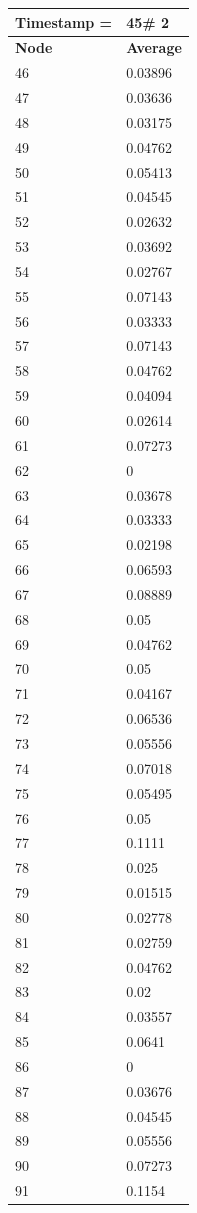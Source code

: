 \begin{tabular}{|l||l|}
\hline
\textbf{Timestamp =} & \textbf{45}\# 2\\\hline
	\textbf{Node} & \textbf{Average} \\ \hline
\hline
	46 & 0.03896 \\ \hline
	47 & 0.03636 \\ \hline
	48 & 0.03175 \\ \hline
	49 & 0.04762 \\ \hline
	50 & 0.05413 \\ \hline
	51 & 0.04545 \\ \hline
	52 & 0.02632 \\ \hline
	53 & 0.03692 \\ \hline
	54 & 0.02767 \\ \hline
	55 & 0.07143 \\ \hline
	56 & 0.03333 \\ \hline
	57 & 0.07143 \\ \hline
	58 & 0.04762 \\ \hline
	59 & 0.04094 \\ \hline
	60 & 0.02614 \\ \hline
	61 & 0.07273 \\ \hline
	62 & 0 \\ \hline
	63 & 0.03678 \\ \hline
	64 & 0.03333 \\ \hline
	65 & 0.02198 \\ \hline
	66 & 0.06593 \\ \hline
	67 & 0.08889 \\ \hline
	68 & 0.05 \\ \hline
	69 & 0.04762 \\ \hline
	70 & 0.05 \\ \hline
	71 & 0.04167 \\ \hline
	72 & 0.06536 \\ \hline
	73 & 0.05556 \\ \hline
	74 & 0.07018 \\ \hline
	75 & 0.05495 \\ \hline
	76 & 0.05 \\ \hline
	77 & 0.1111 \\ \hline
	78 & 0.025 \\ \hline
	79 & 0.01515 \\ \hline
	80 & 0.02778 \\ \hline
	81 & 0.02759 \\ \hline
	82 & 0.04762 \\ \hline
	83 & 0.02 \\ \hline
	84 & 0.03557 \\ \hline
	85 & 0.0641 \\ \hline
	86 & 0 \\ \hline
	87 & 0.03676 \\ \hline
	88 & 0.04545 \\ \hline
	89 & 0.05556 \\ \hline
	90 & 0.07273 \\ \hline
	91 & 0.1154 \\ \hline
\end{tabular}
